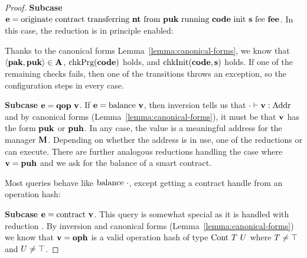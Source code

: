 \begin{proof}
  \textbf{Subcase } $\EXPR = \ORIGINATE\NTEZ\PUK\CODE\INIT\MTEZ$. In
  this case, the  reduction is in principle
  enabled:
  \begin{mathpar}
  \end{mathpar}
  Thanks to the canonical forms Lemma~\ref{lemma:canonical-forms}, we
  know that $\Angle{\PAK,\PUK} \in \ACCOUNTS$, $\CHECKPRG (\CODE)$ holds, and $\CHECKINIT
  (\CODE, \STRING)$ holds. If one of the remaining checks fails,
  then one of the  transitions throws an
  exception, so the configuration steps in every case. 
  
  \textbf{Subcase } $\EXPR = \QOP\ \VAL$. If $\EXPR =
  \GETBALANCE\VAL$, then inversion tells us that $\JTypeExpr\cdot{
    \VAL}\TADDR$ and by canonical forms
  (Lemma~\ref{lemma:canonical-forms}), it must be that $\VAL$ has the
  form $\PUK$ or $\PUH$. In any case, the value is a meaningful
  address for the manager $\MANAGERS$. Depending on whether the
  address is in use, one of the reductions
   or  can
  execute. There are further analogous reductions handling the case where
  $\VAL=\PUH$ and we ask for the balance of a smart contract.

  Most queries behave like $\GETBALANCE\cdot$, except getting a
  contract handle from an operation hash:

  \textbf{Subcase }$\EXPR = \GETCONTRACT\VAL$. This query is somewhat
  special as it is handled with reduction
  . By inversion and canonical forms
  (Lemma~\ref{lemma:canonical-forms}) we know that $\VAL = \OPH$ is a
  valid operation hash of type $\TCONTRACT\ \TYPE\ \TYPEU$ where
  $\TYPE\ne\TNO$ and $\TYPEU \ne\TNO$.


\end{proof}
